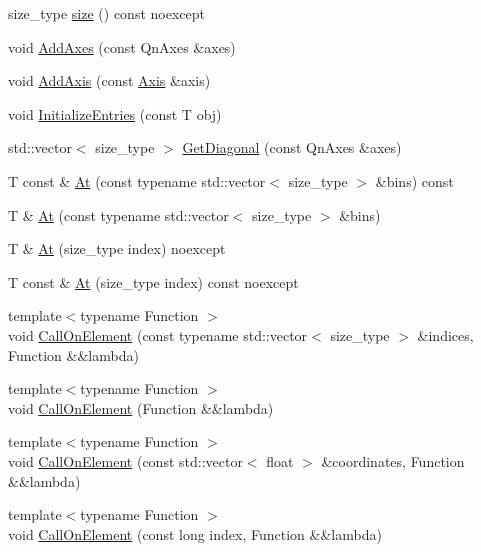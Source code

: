 \begin{DoxyCompactItemize}
size\+\_\+type \mbox{\hyperlink{classQn_1_1DataContainer_a95370695e706347db87491cdd65fcffb}{size}} () const noexcept
\item 
void \mbox{\hyperlink{classQn_1_1DataContainer_a1e60f7b54d499b8bca9ea2a04fc55340}{Add\+Axes}} (const Qn\+Axes \&axes)
\item 
void \mbox{\hyperlink{classQn_1_1DataContainer_a5fd9996f60f536d991b0b4f6cdd9d838}{Add\+Axis}} (const \mbox{\hyperlink{classQn_1_1Axis}{Axis}} \&axis)
\item 
void \mbox{\hyperlink{classQn_1_1DataContainer_a2baf9c75f0652ea0a0ef30aaf2ce8deb}{Initialize\+Entries}} (const T obj)
\item 
std\+::vector$<$ size\+\_\+type $>$ \mbox{\hyperlink{classQn_1_1DataContainer_a5acec0ed294b3225f32981636af698d7}{Get\+Diagonal}} (const Qn\+Axes \&axes)
\item 
T const  \& \mbox{\hyperlink{classQn_1_1DataContainer_a637662b4443d60c9aab35a906ee98877}{At}} (const typename std\+::vector$<$ size\+\_\+type $>$ \&bins) const
\item 
T \& \mbox{\hyperlink{classQn_1_1DataContainer_af1565f4febc1125cac6e1fed8398f38f}{At}} (const typename std\+::vector$<$ size\+\_\+type $>$ \&bins)
\item 
T \& \mbox{\hyperlink{classQn_1_1DataContainer_a929706074edc9dd3bcc89a68c307b9c3}{At}} (size\+\_\+type index) noexcept
\item 
T const  \& \mbox{\hyperlink{classQn_1_1DataContainer_af89617f2b9005713df9134dbd8417835}{At}} (size\+\_\+type index) const noexcept
\item 
{\footnotesize template$<$typename Function $>$ }\\void \mbox{\hyperlink{classQn_1_1DataContainer_a617cf83f205e54105a339e819592daf0}{Call\+On\+Element}} (const typename std\+::vector$<$ size\+\_\+type $>$ \&indices, Function \&\&lambda)
\item 
{\footnotesize template$<$typename Function $>$ }\\void \mbox{\hyperlink{classQn_1_1DataContainer_a1fa55b9f9adc8a07b3a4d7ed51b5516b}{Call\+On\+Element}} (Function \&\&lambda)
\item 
{\footnotesize template$<$typename Function $>$ }\\void \mbox{\hyperlink{classQn_1_1DataContainer_af663740b50d50356b29149e0d013d40d}{Call\+On\+Element}} (const std\+::vector$<$ float $>$ \&coordinates, Function \&\&lambda)
\item 
{\footnotesize template$<$typename Function $>$ }\\void \mbox{\hyperlink{classQn_1_1DataContainer_ad98f8acd6c4ac7f5ba171eb779acbcee}{Call\+On\+Element}} (const long index, Function \&\&lambda)

\end{DoxyCompactItemize}
